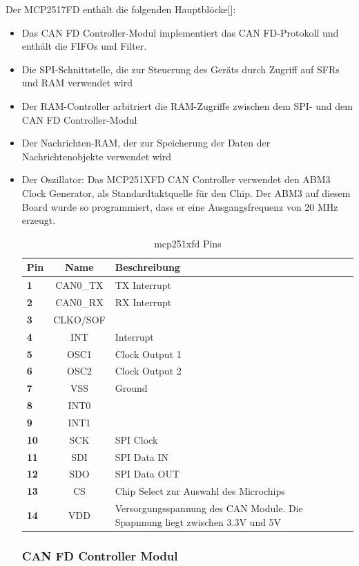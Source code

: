 Der MCP2517FD enthält die folgenden Hauptblöcke[\cite{Transmission2018}]:
\begin{itemize}
	\item Das CAN FD Controller-Modul implementiert das CAN FD-Protokoll und enthält die FIFOs und Filter.
	\item Die SPI-Schnittstelle, die zur Steuerung des Geräts durch Zugriff auf SFRs und RAM verwendet wird
	\item Der RAM-Controller arbitriert die RAM-Zugriffe zwischen dem SPI- und dem CAN FD Controller-Modul
	\item Der Nachrichten-RAM, der zur Speicherung der Daten der Nachrichtenobjekte verwendet wird
	\item Der Oszillator: Das MCP251XFD CAN Controller verwendet den ABM3 Clock Generator, als Standardtaktquelle für den Chip. Der ABM3 auf diesem Board wurde so programmiert, dass er eine Ausgangsfrequenz von 20 MHz erzeugt.
	
	\begin{table}[H]
		\centering
		\begin{tabular}[h]{|l|c|p{5cm}|}
			\hline
			\hline
			\textbf{Pin} & Name & Beschreibung \\
			\hline
			\textbf{1} & CAN0\_TX & TX Interrupt \\
			\hline
			\textbf{2} & CAN0\_RX & RX Interrupt \\
			\hline
			\textbf{3} & CLKO/SOF & \\
			\hline
			\textbf{4} & INT & Interrupt \\
			\hline
			\textbf{5} & OSC1 & Clock Output 1 \\
			\hline
			\textbf{6} & OSC2 & Clock Output 2 \\
			\hline
			\textbf{7} & VSS & Ground \\
			\hline
			\textbf{8} & INT0 &  \\
			\hline
			\textbf{9} & INT1 & \\
			\hline
			\textbf{10} & SCK & SPI Clock \\
			\hline
			\textbf{11} & SDI & SPI Data IN \\
			\hline
			\textbf{12} & SDO & SPI Data OUT \\
			\hline
			\textbf{13} & CS & Chip Select zur Auswahl des Microchips \\
			\hline
			\textbf{14} & VDD & Versorgungsspannung des CAN Module. Die Spapnnung liegt zwischen 3.3V und 5V \\
			\hline
			\hline
		\end{tabular}
		\caption[mcp251xfd Pins]{mcp251xfd Pins}
		\label{tab:mcp:pins}
	\end{table}
	\subsubsection{CAN FD Controller Modul}
	
\end{itemize}

